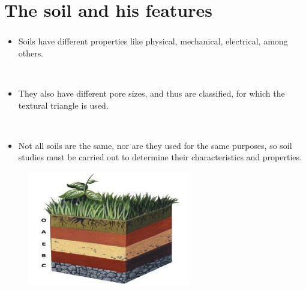 \section{The soil and his features}
\begin{frame}
	\frametitle{\secname}
	\begin{minipage}{0.5\textwidth}
		\begin{itemize}
			\item Soils have \alert{different properties} like physical, mechanical, electrical, among others.

			      \

			\item They also have \alert{different pore sizes}, and thus are
			      classified, for which the \alert{textural triangle} is used.

			      \

			\item  Not all soils are the same, nor are they used for the same purposes,
			      so soil studies must be carried out to determine their \alert{characteristics}
			      and \alert{properties}.
		\end{itemize}
	\end{minipage}
	\begin{minipage}{0.47\textwidth}
		\begin{figure}[ht!]
			\centering
			\includegraphics[height=5cm]{propiedades-suelo}
		\end{figure}
	\end{minipage}
\end{frame}

